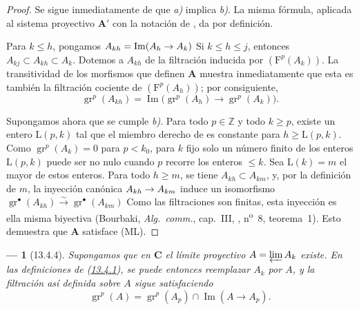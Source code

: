 \documentclass[10pt,oneside,openany]{book}
\theoremstyle{egaenv}\newtheorem*{env}{---}
\theoremstyle{egastatement}
\theoremstyle{egadescription}
\newcommand{\oldpage}[2][]{\marginnote{\normalfont\scriptsize\textbf{#1}\,|\,#2}\ignorespaces}
\renewcommand{\leq}{\leqslant}
\renewcommand{\geq}{\geqslant}
\renewcommand{\to}{\mathchoice{\longrightarrow}{\rightarrow}{\rightarrow}{\rightarrow}}
\begin{document}
\begin{proof}
Se sigue inmediatamente de  que \emph{a)} implica
\emph{b)}. La misma fórmula, aplicada al sistema proyectivo
$\mathbf A'$ con la notación de , da
 por definición.

Para $k\leq h$, pongamos
$A_{kh}=\operatorname{Im}(A_h\to A_k)$
Si $k\leq h\leq j$, entonces
$A_{kj}\subset A_{kh}\subset A_k$.
Dotemos a $A_{kh}$ de la filtración inducida por
$(\mathrm F^p(A_k))$.
La transitividad de los morfismos que definen $\mathbf A$ muestra
inmediatamente que esta es también la filtración cociente de
$(\mathrm F^p(A_h))$; por consiguiente,
\begin{equation}
\label{0.13.4.3.2-fr}
\tag{13.4.3.2}
\operatorname{gr}^p(A_{kh})=
\operatorname{Im}\bigl(\operatorname{gr}^p(A_h)\longrightarrow
\operatorname{gr}^p(A_k)\bigr).
\end{equation}

\oldpage[0\textsubscript{III}]{71}
Supongamos ahora que se cumple \emph{b)}.
Para todo $p\in\mathbb Z$ y todo $k\geq p$, existe un entero
$\mathrm L(p,k)$ tal que el miembro derecho de
 es constante para $h\geq\mathrm L(p,k)$.
Como $\operatorname{gr}^p(A_k)=0$ para $p<k_0$, para $k$ fijo solo
un número finito de los enteros $\mathrm L(p,k)$ puede ser no nulo cuando
$p$ recorre los enteros $\leq k$.
Sea $\mathrm L(k)=m$ el mayor de estos enteros.
Para todo $h\geq m$, se tiene
$A_{kh}\subset A_{km}$, y, por la definición de $m$, la inyección
canónica
$A_{kh}\to A_{km}$ induce un isomorfismo
$\operatorname{gr}^\bullet(A_{kh})\xrightarrow{\sim}
\operatorname{gr}^\bullet(A_{km})$
Como las filtraciones son finitas, esta inyección es ella misma biyectiva
(Bourbaki, \emph{Alg.\ comm.}, cap.~III, ,
n\textsuperscript{o}~8, teorema~1).
Esto demuestra que $\mathbf A$ satisface (ML).
\end{proof}

\begin{env}[13.4.4]
\label{0.13.4.4-fr}
Supongamos que en $\boldsymbol{C}$ el límite proyectivo $A=\varprojlim A_k$ existe. En las definiciones de (\hyperref[0.13.4.1-fr]{13.4.1}), se puede entonces reemplazar $A_k$
por $A$, y la filtración así definida sobre $A$ sigue satisfaciendo
\begin{equation}
\label{0.13.4.4.1-fr}
\tag{13.4.4.1}
\operatorname{gr}^p(A)=\operatorname{gr}^p(A_p)
\cap\operatorname{Im}(A\longrightarrow A_p).
\end{equation}
\end{env}
\end{document}
